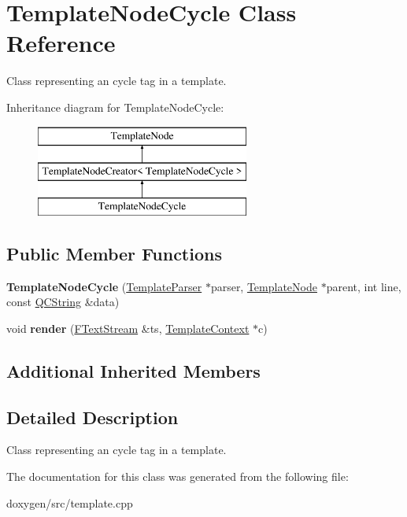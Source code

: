 \hypertarget{class_template_node_cycle}{}\section{Template\+Node\+Cycle Class Reference}
\label{class_template_node_cycle}


Class representing an \textquotesingle{}cycle\textquotesingle{} tag in a template.  


Inheritance diagram for Template\+Node\+Cycle\+:\begin{figure}[H]
\begin{center}
\leavevmode
\includegraphics[height=3.000000cm]{class_template_node_cycle}
\end{center}
\end{figure}
\subsection*{Public Member Functions}
\begin{DoxyCompactItemize}
\item 
\mbox{\label{class_template_node_cycle_a19dd6fc0b855317dd8d17b9ae8ea24f5}} 
{\bfseries Template\+Node\+Cycle} (\mbox{\hyperlink{class_template_parser}{Template\+Parser}} $\ast$parser, \mbox{\hyperlink{class_template_node}{Template\+Node}} $\ast$parent, int line, const \mbox{\hyperlink{class_q_c_string}{Q\+C\+String}} \&data)
\item 
\mbox{\label{class_template_node_cycle_a01a239419afdf6e9c4b64b6a3f747054}} 
void {\bfseries render} (\mbox{\hyperlink{class_f_text_stream}{F\+Text\+Stream}} \&ts, \mbox{\hyperlink{class_template_context}{Template\+Context}} $\ast$c)
\end{DoxyCompactItemize}
\subsection*{Additional Inherited Members}


\subsection{Detailed Description}
Class representing an \textquotesingle{}cycle\textquotesingle{} tag in a template. 

The documentation for this class was generated from the following file\+:\begin{DoxyCompactItemize}
\item 
doxygen/src/template.\+cpp\end{DoxyCompactItemize}
